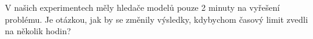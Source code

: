 V našich experimentech měly hledače modelů pouze 2 minuty
na vyřešení problému. Je otázkou, jak by se změnily
výsledky, kdybychom časový limit zvedli na několik hodin?



